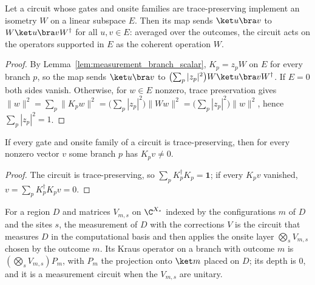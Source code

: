 \begin{theorem}
    \label{thm:measurement_removal}
    \leanok
    Let a circuit whose gates and onsite families are trace-preserving implement an isometry
    $W$ on a linear subspace $E$. Then its map sends $\ket u\bra v$ to $W\ket u\bra vW^\dagger$
    for all $u,v\in E$: averaged over the outcomes, the circuit acts on the operators supported
    in $E$ as the coherent operation $W$.
\end{theorem}
\begin{proof}
    \leanok
    By Lemma~\ref{lem:measurement_branch_scalar}, $K_p=z_pW$ on $E$ for every branch $p$, so the
    map sends $\ket u\bra v$ to $\bigl(\sum_p|z_p|^2\bigr)W\ket u\bra vW^\dagger$. If $E=0$ both
    sides vanish. Otherwise, for $w\in E$ nonzero, trace preservation gives
    $\|w\|^2=\sum_p\|K_pw\|^2=\bigl(\sum_p|z_p|^2\bigr)\|Ww\|^2=\bigl(\sum_p|z_p|^2\bigr)\|w\|^2$,
    hence $\sum_p|z_p|^2=1$.
\end{proof}

\begin{lemma}
    \label{lem:measurement_nonzero_branch}
    \leanok
    If every gate and onsite family of a circuit is trace-preserving, then for every nonzero
    vector $v$ some branch $p$ has $K_pv\neq0$.
\end{lemma}
\begin{proof}
    \leanok
    The circuit is trace-preserving, so $\sum_pK_p^\dagger K_p=\mathbf{1}$; if every $K_pv$ vanished,
    $v=\sum_pK_p^\dagger K_pv=0$.
\end{proof}

\begin{definition}
    \label{def:measurement_correct}
    \leanok
    For a region $D$ and matrices $V_{m,s}$ on $\C^{X_s}$ indexed by the configurations $m$ of
    $D$ and the sites $s$, the measurement of $D$ with the corrections $V$ is the circuit that
    measures $D$ in the computational basis and then applies the onsite layer
    $\bigotimes_sV_{m,s}$ chosen by the outcome $m$. Its Kraus operator on a branch with outcome
    $m$ is $(\bigotimes_sV_{m,s})P_m$, with $P_m$ the projection onto $\ket m$ placed on $D$;
    its depth is $0$, and it is a measurement circuit when the $V_{m,s}$ are unitary.
\end{definition}

